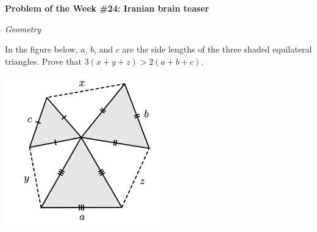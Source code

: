 \begin{potw}\vspace{5pt}
{\large\textbf{Problem of the Week \#24: Iranian brain teaser}}\vspace{5pt}

\textit{Geometry}\V

In the figure below, $a$, $b$, and $c$ are the side lengths of the three shaded equilateral triangles. Prove that $3(x+y+z) > 2(a+b+c)$.\V

\begin{center}
\includegraphics[width=7cm]{Screen Shot 2022-01-01 at 1.58.00 AM.png}
\end{center}
\end{potw}\V

